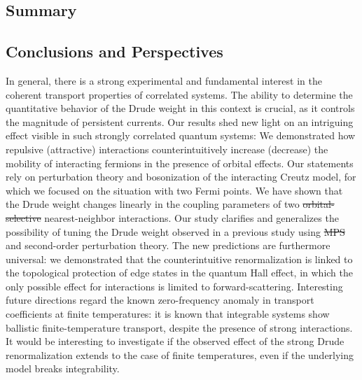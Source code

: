 \documentclass{svmono}
\providecommand{\DIFaddtex}[1]{{\protect\color{blue}\uwave{#1}}} %
\providecommand{\DIFdeltex}[1]{{\protect\color{red}\sout{#1}}}                      %
\providecommand{\DIFaddbegin}{} %
\providecommand{\DIFaddend}{} %
\providecommand{\DIFdelbegin}{} %
\providecommand{\DIFdelend}{} %
\providecommand{\DIFadd}[1]{\texorpdfstring{\DIFaddtex{#1}}{#1}} %
\providecommand{\DIFdel}[1]{\texorpdfstring{\DIFdeltex{#1}}{}} %
\newcommand{\DIFscaledelfig}{0.5}
\newlength{\DIFdelgraphicswidth} %
\newlength{\DIFdelgraphicsheight} %
\newcommand{\DIFaddincludegraphics}[2][]{{\color{blue}\fbox{\DIFOincludegraphics[#1]{#2}}}} %
\newcommand{\DIFdelincludegraphics}[2][]{%
\sbox{\DIFdelgraphicsbox}{\DIFOincludegraphics[#1]{#2}}%
\settoboxwidth{\DIFdelgraphicswidth}{\DIFdelgraphicsbox} %
\settoboxtotalheight{\DIFdelgraphicsheight}{\DIFdelgraphicsbox} %
\scalebox{\DIFscaledelfig}{%
\parbox[b]{\DIFdelgraphicswidth}{\usebox{\DIFdelgraphicsbox}\\[-\baselineskip] \rule{\DIFdelgraphicswidth}{0em}}\llap{\resizebox{\DIFdelgraphicswidth}{\DIFdelgraphicsheight}{%
\setlength{\unitlength}{\DIFdelgraphicswidth}%
\begin{picture}(1,1)%
\thicklines\linethickness{2pt} %
{\color[rgb]{1,0,0}\put(0,0){\framebox(1,1){}}}%
{\color[rgb]{1,0,0}\put(0,0){\line( 1,1){1}}}%
{\color[rgb]{1,0,0}\put(0,1){\line(1,-1){1}}}%
\end{picture}%
}\hspace*{3pt}}} %
} %
\DeclareRobustCommand{\DIFaddbegin}{\DIFOaddbegin \let\includegraphics\DIFaddincludegraphics} %
\DeclareRobustCommand{\DIFaddend}{\DIFOaddend \let\includegraphics\DIFOincludegraphics} %
\DeclareRobustCommand{\DIFdelbegin}{\DIFOdelbegin \let\includegraphics\DIFdelincludegraphics} %
\DeclareRobustCommand{\DIFdelend}{\DIFOaddend \let\includegraphics\DIFOincludegraphics} %
\begin{document}
\clearpage{}\begin{partbacktext}
    \part{Summary}
\end{partbacktext}
\clearpage{}
\clearpage{}\chapter*{Conclusions and Perspectives}
In general, there is a strong experimental and fundamental interest in the coherent transport properties of correlated systems.
The ability to determine the quantitative behavior of the Drude weight in this context is crucial, as it controls the magnitude of persistent currents.
Our results shed new light on an intriguing effect visible in such strongly correlated quantum systems: We demonstrated how repulsive (attractive) interactions counterintuitively increase (decrease) the mobility of interacting fermions in the presence of orbital effects.
Our statements rely on perturbation theory and bosonization of the interacting Creutz model, for which we focused on the situation with two Fermi points.
We have shown that the Drude weight changes linearly in the coupling parameters of two \DIFdelbegin \DIFdel{orbital- selective }\DIFdelend \DIFaddbegin \DIFadd{orbital-selective }\DIFaddend nearest-neighbor interactions.
Our study clarifies and generalizes the possibility of tuning the Drude weight observed in a previous study using \DIFdelbegin \DIFdel{MPS }\DIFdelend \DIFaddbegin \DIFadd{matrix product states }\DIFaddend and second-order perturbation theory.
The new predictions are furthermore universal: we demonstrated that the counterintuitive renormalization is linked to the topological protection of edge states in the quantum Hall effect, in which the only possible effect for interactions is limited to forward-scattering.
Interesting future directions regard the known zero-frequency anomaly in transport coefficients at finite temperatures: it is known that integrable systems show ballistic finite-temperature transport, despite the presence of strong interactions.
It would be interesting to investigate if the observed effect of the strong Drude renormalization extends to the case of finite temperatures, even if the underlying model breaks integrability.
\end{document}
